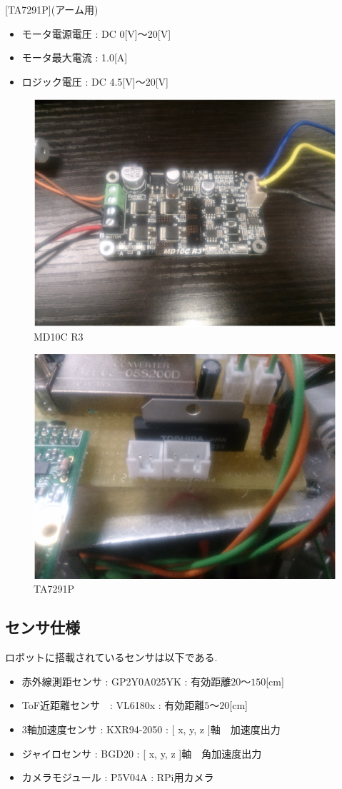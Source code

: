 [TA7291P](アーム用)
\begin{itemize}
 \item モータ電源電圧 : DC 0[V]$〜$20[V]
 \item モータ最大電流 : 1.0[A]
 \item ロジック電圧 : DC 4.5[V]$〜$20[V]
\end{itemize}
\begin{figure}[h]
 \centering
 \includegraphics[width=0.5\hsize]{../kakeru/picture/MD10C.eps}
    \caption{MD10C R3}
    \label{MD10C}
\end{figure}
\begin{figure}[h]
 \centering
 \includegraphics[width=0.5\hsize]{../kakeru/picture/TO.eps}
    \caption{TA7291P}
    \label{TA7291P}
\end{figure}

\newpage
\subsection{センサ仕様}
ロボットに搭載されているセンサは以下である.
\begin{itemize}
 \item 赤外線測距センサ : GP2Y0A025YK : 有効距離$20 〜 150$[cm]
 \item ToF近距離センサ　: VL6180x    : 有効距離$5 〜 20$[cm]
 \item 3軸加速度センサ : KXR94-2050 : [ x, y, z ]軸　加速度出力
 \item ジャイロセンサ : BGD20 : [ x, y, z ]軸　角加速度出力
 \item カメラモジュール : P5V04A : RPi用カメラ
\end{itemize}

